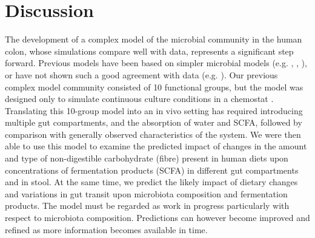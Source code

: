 \documentclass[a4paper]{article}
\begin{document}
\section*{Discussion}
The development of a complex model of the microbial community in the human colon, whose simulations compare well with data, represents a significant step forward. 
Previous models have been based on simpler microbial models (e.g. \cite{Cremer17}, \cite{Munoz}, \cite{moorthy}), or have not shown such a good agreement with data (e.g. \cite{smith}).
Our previous complex model community consisted of 10 functional groups, but the model was designed only to simulate continuous culture conditions in a chemostat \citep{Kettle2015}. 
Translating this 10-group model into an in vivo setting has required introducing multiple gut compartments, and the absorption of water and SCFA, followed by comparison with generally observed characteristics of the system. 
We were then able to use this model to examine the predicted impact of changes in the amount and type of non-digestible carbohydrate (fibre) present in human diets upon concentrations of fermentation products (SCFA) in different gut compartments and in stool. At the same time, we predict the likely impact of dietary changes and variations in gut transit upon microbiota composition and fermentation products. 
The model must be regarded as work in progress particularly with respect to microbiota composition. Predictions can however become improved and refined as more information becomes available in time.
\end{document}
